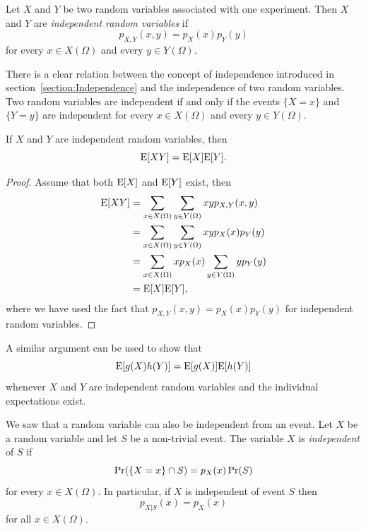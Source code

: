 Let $X$ and $Y$ be two random variables associated with one experiment.
Then $X$ and $Y$ are \emph{independent random variables} if
\begin{equation*}
p_{X,Y} (x,y) = p_X (x) p_Y (y)
\end{equation*}
for every $x \in X(\Omega)$ and every $y \in Y(\Omega)$.

There is a clear relation between the concept of independence introduced in section~\ref{section:Independence} and the independence of two random variables.
Two random variables are independent if and only if the events $\{ X = x \}$ and $\{ Y = y \}$ are independent for every $x \in X(\Omega)$ and every $y \in Y(\Omega)$.

\begin{theorem}
If $X$ and $Y$ are independent random variables, then
\begin{equation*}
\mathrm{E} [X Y] = \mathrm{E} [X] \mathrm{E} [Y] .
\end{equation*}
\end{theorem}
\begin{proof}
Assume that both $\mathrm{E} [X]$ and $\mathrm{E}[Y]$ exist, then
\begin{equation*}
\begin{split}
\mathrm{E} [XY]
&= \sum_{x \in X(\Omega)} \sum_{y \in Y(\Omega)} x y p_{X,Y} (x,y) \\
&= \sum_{x \in X(\Omega)} \sum_{y \in Y(\Omega)} x y p_X (x) p_Y (y) \\
&= \sum_{x \in X(\Omega)} x p_X (x) \sum_{y \in Y(\Omega)} y p_Y (y) \\
&= \mathrm{E} [X] \mathrm{E} [Y] ,
\end{split}
\end{equation*}
where we have used the fact that $p_{X,Y} (x,y) = p_X (x) p_Y (y)$ for independent random variables.
\end{proof}


A similar argument can be used to show that
\begin{equation*}
\mathrm{E}[ g(X) h(Y) ] = \mathrm{E} [ g(X) ] \mathrm{E} [ h(Y) ]
\end{equation*}
whenever $X$ and $Y$ are independent random variables and the individual expectations exist.

We saw that a random variable can also be independent from an event.
Let $X$ be a random variable and let $S$ be a non-trivial event.
The variable $X$ is \emph{independent} of $S$ if
\begin{equation*}
\Pr (\{X = x \} \cap S ) = p_X (x) \Pr (S)
\end{equation*}
for every $x \in X(\Omega)$.
In particular, if $X$ is independent of event $S$ then
\begin{equation*}
p_{X|S} (x) = p_X (x)
\end{equation*}
for all $x \in X(\Omega)$.

